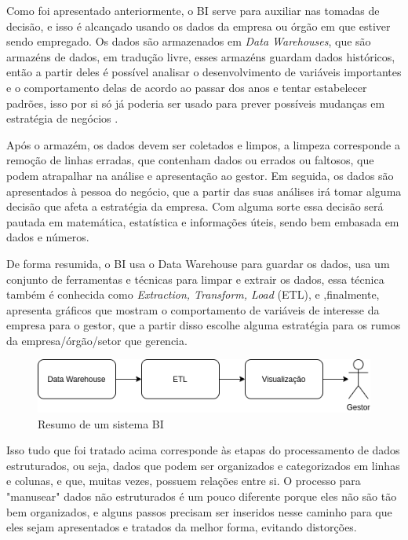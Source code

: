 Como foi apresentado anteriormente, o BI serve para auxiliar nas tomadas de decisão, e isso é alcançado usando os dados da empresa ou órgão em que estiver sendo empregado. Os dados são armazenados em \textit{Data Warehouses}, que são armazéns de dados, em tradução livre, esses armazéns guardam dados históricos, então a partir deles é possível analisar o desenvolvimento de variáveis importantes e o comportamento delas de acordo ao passar dos anos e tentar estabelecer padrões, isso por si só já poderia ser usado para prever possíveis mudanças em estratégia de negócios \cite{negash1}.

Após o armazém, os dados devem ser coletados e limpos, a limpeza corresponde a remoção de linhas erradas, que contenham dados ou errados ou faltosos, que podem atrapalhar na análise e apresentação ao gestor. Em seguida, os dados são apresentados à pessoa do negócio, que a partir das suas análises irá tomar alguma decisão que afeta a estratégia da empresa. Com alguma sorte essa decisão será pautada em matemática, estatística e informações úteis, sendo bem embasada em dados e números.

De forma resumida, o BI usa o Data Warehouse para guardar os dados, usa um conjunto de ferramentas e técnicas para limpar e extrair os dados, essa técnica também é conhecida como \textit{Extraction, Transform, Load} (ETL), e ,finalmente, apresenta gráficos que mostram o comportamento de variáveis de interesse da empresa para o gestor, que a partir disso escolhe alguma estratégia para os rumos da empresa/órgão/setor que gerencia.

\begin{figure}[h]
	\centering
	\includegraphics[scale=0.80]{./figures/cap1/resumo_bi.png}
	\caption{Resumo de um sistema BI}
\end{figure}

Isso tudo que foi tratado acima corresponde às etapas do processamento de dados estruturados, ou seja, dados que podem ser organizados e categorizados em linhas e colunas, e que, muitas vezes, possuem relações entre si. O processo para "manusear" dados não estruturados é um pouco diferente porque eles não são tão bem organizados, e alguns passos precisam ser inseridos nesse caminho para que eles sejam apresentados e tratados da melhor forma, evitando distorções.

